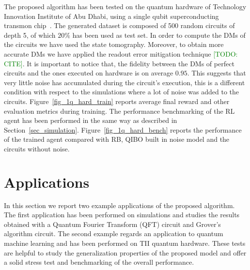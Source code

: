 \documentclass[referee,sn-basic]{sn-jnl} %
\newcommand{\todo}[1]{\textcolor{green}{[TODO: #1]}}
\begin{document}
The proposed algorithm has been tested on the quantum hardware of Technology Innovation Institute of Abu Dhabi, using a single qubit superconducting transmon chip~\cite{doi:10.1126/science.1231930}. The generated dataset is composed of 500 random circuits of depth 5, of which $20\%$ has been used as test set. In order to compute the DMs of the circuits we have used the state tomography. Moreover, to obtain more accurate DMs we have applied the readout error mitigation technique \todo{CITE}. It is important to notice that, the fidelity between the DMs of perfect circuits and the ones executed on hardware is on average $0.95$. This suggests that very little noise has accumulated during the circuit's execution, this is a different condition with respect to the simulations where a lot of noise was added to the circuits. Figure~\ref{fig_1q_hard_train} reports average final reward and other evaluation metrics during training.
The performance benchmarking of the RL agent has been performed in the same way as described in Section~\ref{sec_simulation}. Figure~\ref{fig_1q_hard_bench} reports the performance of the trained agent compared with RB, QIBO built in noise model and the circuits without noise. 

\newpage
\section{Applications} \label{sec_applications}
In this section we report two example applications of the proposed algorithm. The first application has been performed on simulations and studies the results obtained with a Quantum Fourier Transform (QFT) circuit and Grover's algorithm circuit. The second example regards an application to quantum machine learning and has been performed on TII quantum hardware. These tests are helpful to study the generalization properties of the proposed model and offer a solid stress test and benchmarking of the overall performance.
\end{document}
